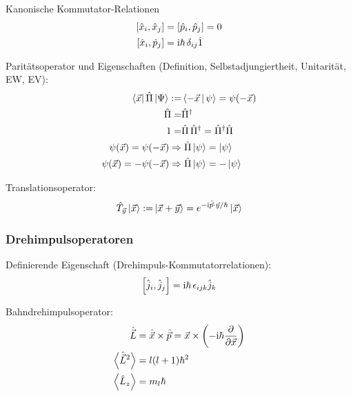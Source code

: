 		\noindent
		Kanonische Kommutator-Relationen
		\begin{equation}
			\begin{aligned}
				\left[ \hat{x}_i, \hat{x}_j \right] &= \left[ \hat{p}_i, \hat{p}_j \right] = 0 \\
				\left[ \hat{x}_i, \hat{p}_j \right] &= \mathrm{i}\hbar\, \delta_{ij}\hat{1} \\
			\end{aligned}
		\end{equation}

		\noindent
		Paritätsoperator und Eigenschaften (Definition, Selbstadjungiertheit, Unitarität, EW, EV):
		\begin{equation}
			\begin{aligned}
				\Bra{\vec{x}} \hat{\Pi} \Ket{\Psi} :=& \Braket{-\vec{x} | \psi} = \psi(-\vec{x}) \\
				\hat{\Pi} =& \hat{\Pi}^\dagger\\
				1 =& \hat{\Pi} \,\hat{\Pi}^\dagger = \hat{\Pi}^\dagger \hat{\Pi} \\
				\psi(\vec{x}) = \psi(-\vec{x}) \Rightarrow&\; \hat{\Pi}\Ket{\psi} = \Ket{\psi} \\
				\psi(\vec{x}) = -\psi(-\vec{x}) \Rightarrow&\; \hat{\Pi}\Ket{\psi} = -\Ket{\psi} \\
			\end{aligned}
		\end{equation}

		\noindent
		Translationsoperator:
		\begin{equation}
			\begin{aligned}
				\hat{T}_{\vec{y}}\Ket{\vec{x}} :=& \Ket{\vec{x} + \vec{y}} = e^{-\mathrm{i}\hat{\vec{p}}\cdot\vec{y}/\hbar}\Ket{\vec{x}} \\
			\end{aligned}
		\end{equation}

	\subsubsection{Drehimpulsoperatoren}
		\noindent
		Definierende Eigenschaft (Drehimpuls-Kommutatorrelationen):
		\begin{equation}
			\left[ \hat{j}_i, \hat{j}_j \right] = \mathrm{i}\hbar\, \epsilon_{ijk} \hat{j}_k
		\end{equation}

		\noindent
		Bahndrehimpulsoperator:
		\begin{equation}
			\begin{aligned}
				\hat{\vec{L}} &= \hat{\vec{x}}\times \hat{\vec{p}} = \vec{x}\times\left(-\mathrm{i}\hbar\frac{\partial }{\partial \vec{x}}\right) \\
				\left< \hat{\vec{L}}^2 \right> &= l(l+1)\hbar^2 \\
				\left< \hat{L}_z \right> &= m_l \hbar \\
			\end{aligned}
		\end{equation}

